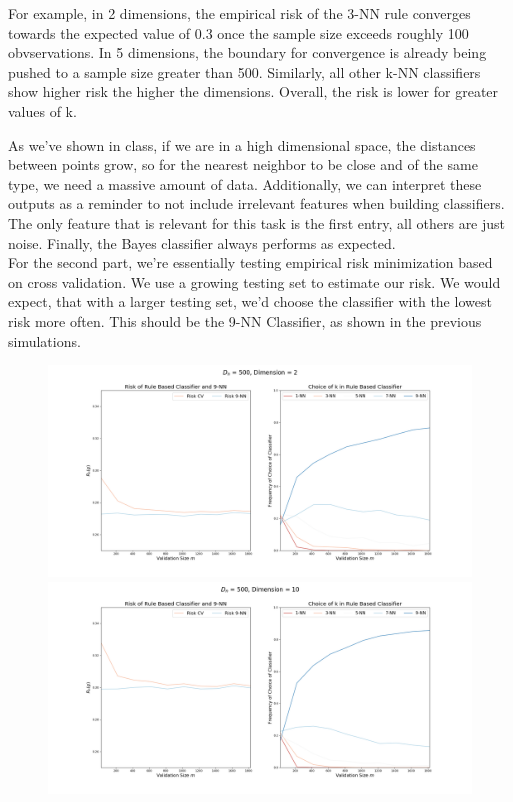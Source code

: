 \documentclass[a4paper, 11pt]{article} %
\begin{document}
For example, in 2 dimensions, the empirical risk of the 3-NN rule converges towards the expected value of 0.3 once the sample size exceeds roughly 100 obvservations. In 5 dimensions, the boundary for convergence is already being pushed to a sample size greater than 500. Similarly, all other k-NN classifiers show higher risk the higher the dimensions. Overall, the risk is lower for greater values of k.

As we've shown in class, if we are in a high dimensional space, the distances between points grow, so for the nearest neighbor to be close and of the same type, we need a massive amount of data. Additionally, we can interpret these outputs as a reminder to not include irrelevant features when building classifiers. The only feature that is relevant for this task is the first entry, all others are just noise. Finally, the Bayes classifier always performs as expected. \\

For the second part, we're essentially testing empirical risk minimization based on cross validation. We use a growing testing set to estimate our risk. We would expect, that with a larger testing set, we'd choose the classifier with the lowest risk more often. This should be the 9-NN Classifier, as shown in the previous simulations. 

\begin{figure}[H]
\centering
\includegraphics[scale= 0.3]{CV_KNN_n500_d2}
\includegraphics[scale= 0.3]{CV_KNN_n500_d10}
\end{figure}
\end{document}
